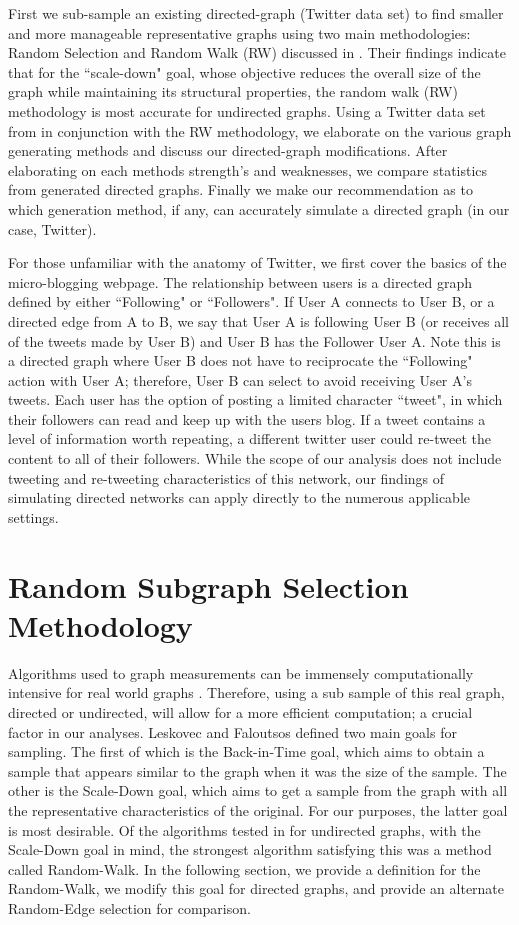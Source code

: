 \documentclass[pdftex,11pt,a4paper,twocolumn]{scrartcl}
\begin{document}
First we sub-sample an existing directed-graph (Twitter data set) to find smaller and more manageable representative graphs using two main methodologies: Random Selection and Random Walk (RW) discussed in \cite{sampling}. Their findings indicate that for the ``scale-down" goal, whose objective reduces the overall size of the graph while maintaining its structural properties, the random walk (RW) methodology is most accurate for undirected graphs. Using a Twitter data set from \cite{snap} in conjunction with the RW methodology, we elaborate on the various graph generating methods and discuss our directed-graph modifications. After elaborating on each methods strength's and weaknesses, we compare statistics from generated directed graphs. Finally we make our recommendation as to which generation method, if any, can accurately simulate a directed graph (in our case, Twitter).

For those unfamiliar with the anatomy of Twitter, we first cover the basics of the micro-blogging webpage. The relationship between users is a directed graph defined by either ``Following" or ``Followers". If User A connects to User B, or a directed edge from A to B, we say that User A is following User B (or receives all of the tweets made by User B) and User B has the Follower User A. Note this is a directed graph where User B does not have to reciprocate the ``Following" action with User A; therefore, User B can select to avoid receiving User A's tweets. Each user has the option of posting a limited character ``tweet", in which their followers can read and keep up with the users blog. If a tweet contains a level of information worth repeating, a different twitter user could re-tweet the content to all of their followers. While the scope of our analysis does not include tweeting and re-tweeting characteristics of this network, our findings of simulating directed networks can apply directly to the numerous applicable settings.

\section{Random Subgraph Selection Methodology}
Algorithms used to graph measurements can be immensely computationally intensive for real world graphs \cite{sampling}. Therefore, using a sub sample of this real graph, directed or undirected, will allow for a more efficient computation; a crucial factor in our analyses. Leskovec and Faloutsos defined two main goals for sampling. The first of which is the Back-in-Time goal, which aims to obtain a sample that appears similar to the graph when it was the size of the sample. The other is the Scale-Down goal, which aims to get a sample from the graph with all the representative characteristics of the original. For our purposes, the latter goal is most desirable. Of the algorithms tested in \cite{sampling} for undirected graphs, with the Scale-Down goal in mind, the strongest algorithm satisfying this was a method called Random-Walk. In the following section, we provide a definition for the Random-Walk, we modify this goal for directed graphs, and provide an alternate Random-Edge selection for comparison.
\end{document}
